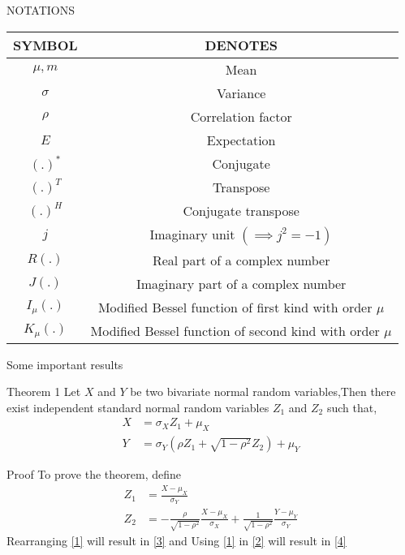 \documentclass{beamer}
\providecommand{\brak}[1]{\ensuremath{\left(#1\right)}}
\begin{document}
\begin{frame}
    \begin{block}{NOTATIONS}
    \begin{center}
    \begin{tabular}{ |c|c| } 
    \hline
    SYMBOL & DENOTES \\ 
    \hline
    $\mu,m$ & Mean\\ \hline
    $\sigma$ & Variance\\ \hline
    $\rho$ & Correlation factor\\ \hline
    $E$ & Expectation \\
    \hline
    $(.)^*$ & Conjugate \\ \hline
    $(.)^T $ & Transpose \\\hline
    $(.)^H $ & Conjugate transpose\\\hline
    $j$ & Imaginary unit $\brak{\implies j^2={-1}}$\\\hline
    $ R(.)$ & Real part of a complex number\\\hline
    $ J(.)$ & Imaginary part of a complex number\\\hline
    $I_{\mu}(.)$& Modified Bessel function of first kind with order $\mu$\\\hline
    $K_{\mu}(.)$& Modified Bessel function of second kind with order $\mu$\\
     \hline
    \end{tabular}
    \end{center}
    \end{block}
\end{frame}
\begin{frame}{Some important results}
    \begin{block}{Theorem 1}
    Let $X$ and $Y$ be two bivariate normal random variables,Then there exist independent standard normal random variables $Z_1$ and $Z_2$ such that,
    \begin{align}
        X&=\sigma_X Z_1 +\mu_X\label{3}\\
        Y&=\sigma_Y\brak{\rho Z_1+\sqrt{1-\rho^2}Z_2}+\mu_Y\label{4}
    \end{align}
    \end{block}
    \begin{block}{Proof}
    To prove the theorem, define
    \begin{align}
        Z_1&=\frac{X-\mu_X}{\sigma_Y}\label{1}\\
        Z_2&=-\frac{\rho}{\sqrt{1-\rho^2}}\frac{X-\mu_X}{\sigma_X}+\frac{1}{\sqrt{1-\rho^2}}\frac{Y-\mu_Y}{\sigma_Y}\label{2}
    \end{align}
    Rearranging \eqref{1} will result in \eqref{3} and
    Using \eqref{1} in \eqref{2} will result in \eqref{4}
    \end{block}
\end{frame}
\end{document}
